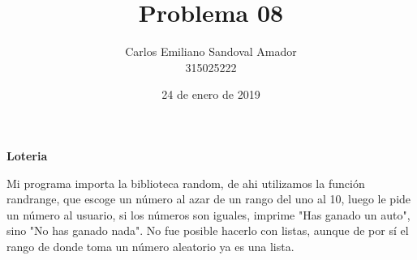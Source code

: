 \documentclass[letterpaper, 12pt, oneside]{article}%
\title{Problema 08}
\author{Carlos Emiliano Sandoval Amador \\ 315025222}
\date{24 de enero de 2019}
\begin{document}
	\maketitle
	\begin{center}
		\textbf{\large Loteria}
	\end{center}
	Mi programa importa la biblioteca random, de ahi utilizamos la función randrange, que escoge un número al azar de un rango del uno al 10, luego le pide un número al usuario, si los números son iguales, imprime "Has ganado un auto", sino "No has ganado nada". No fue posible hacerlo con listas, aunque de por sí el rango de donde toma un número aleatorio ya es una lista.
\end{document}

